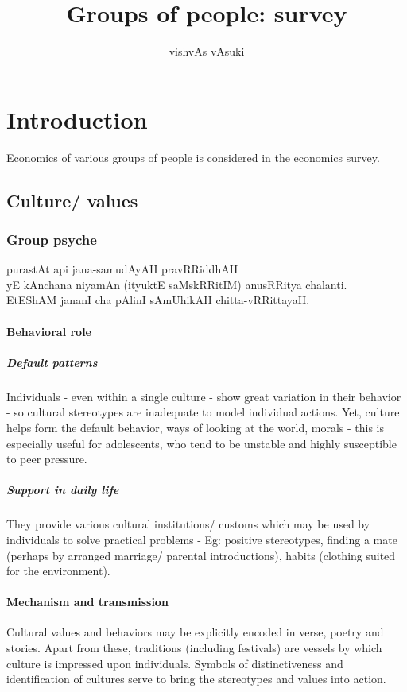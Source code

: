 \documentclass[oneside, article]{memoir}
\title{Groups of people: survey}
\author{vishvAs vAsuki}
\begin{document}
\maketitle

\part{Introduction}
Economics of various groups of people is considered in the economics survey.

\chapter{Culture/ values}
\section{Group psyche}
purastAt api jana-samudAyAH pravRRiddhAH \\
yE kAnchana niyamAn (ityuktE saMskRRitIM) anusRRitya chalanti.\\
EtEShAM jananI cha pAlinI sAmUhikAH chitta-vRRittayaH. 

\subsection{Behavioral role}
\subsubsection{Default patterns}
Individuals - even within a single culture - show great variation in their behavior - so cultural stereotypes are inadequate to model individual actions. Yet, culture helps form the default behavior, ways of looking at the world, morals - this is especially useful for adolescents, who tend to be unstable and highly susceptible to peer pressure.

\subsubsection{Support in daily life}
They provide various cultural institutions/ customs which may be used by individuals to solve practical problems - Eg:  positive stereotypes, finding a mate (perhaps by arranged marriage/ parental introductions), habits (clothing suited for the environment).

\subsection{Mechanism and transmission}
Cultural values and behaviors may be explicitly encoded in verse, poetry and stories. Apart from these, traditions (including festivals) are vessels by which culture is impressed upon individuals. Symbols of distinctiveness and identification of cultures serve to bring the stereotypes and values into action.
\end{document}
